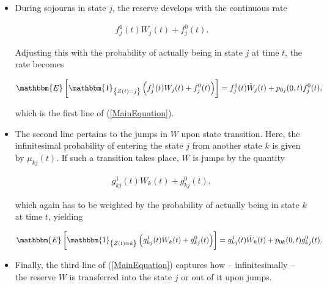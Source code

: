 \documentclass{article}
\newcommand{\1}[1]{\mathbbm{1}_{\left\lbrace #1 \right\rbrace}}
\newcommand{\expec}[1][def]{\mathbbm{E} \left[ #1 \right]}
\theoremstyle{break}
\theoremstyle{remark}
\numberwithin{equation}{section}
\begin{document}
\begin{itemize}
	\item During sojourns in state $j$, the reserve develops with the continuous rate
	
	\begin{align*}
		f_j^1(t) W_j(t) + f_j^0(t).
	\end{align*}

	Adjusting this with the probability of actually being in state $j$ at time $t$, the rate becomes
	
	\begin{align*}
		\expec[\1{Z(t)=j} \left(f_j^1(t) W_j(t) + f_j^0(t)\right)] = f_j^1(t) \tilde{W}_j(t) + p_{0j}(0,t) f_j^0(t),
	\end{align*}

	which is the first line of (\ref{MainEquation}).
	\item The second line pertains to the jumps in $W$ upon state transition. Here, the infinitesimal probability of entering the state $j$ from another state $k$ is given by $\mu_{kj}(t)$. If such a transition takes place, $W$ is jumps by the quantity
	
	\begin{align*}
		g_{kj}^1(t) W_k(t) + g_{kj}^0(t),
	\end{align*}

	which again has to be weighted by the probability of actually being in state $k$ at time $t$, yielding
	
	\begin{align*}
		\expec[\1{Z(t)=k} \left(g_{kj}^1(t) W_k(t) + g_{kj}^0(t)\right)] = g_{kj}^1(t) \tilde{W}_k(t) + p_{0k}(0,t) g_{kj}^0(t).
	\end{align*}

	\item Finally, the third line of (\ref{MainEquation}) captures how -- infinitesimally -- the reserve $W$ is transferred into the state $j$ or out of it upon jumps.
\end{itemize}
\end{document}
